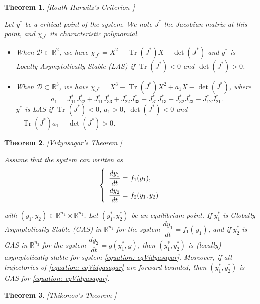 \documentclass{article}
\DeclareMathOperator{\Tr}{Tr}
\newtheorem{theorem}{Theorem}
\theoremstyle{definition}
\theoremstyle{remark}
\begin{document}
\begin{appendix}
\begin{theorem} \label{theorem:Routh-Hurwitz} [Routh-Hurwitz's Criterion \cite{wiggins_introduction_2003}]

Let $y^*$ be a critical point of the system. We note $J^*$ the Jacobian matrix at this point, and $\chi_{J^*}$ its characteristic polynomial.

\begin{itemize}
\item When $\mathcal{D}\subset \mathbb{R}^2$, we have $\chi_{J^*} = X^2 - \Tr(J^*) X + \det(J^*)$ and $y^*$ is Locally Asymptotically Stable (LAS) if $\Tr(J^*) < 0$ and $\det(J^*) > 0$.
\item When $\mathcal{D}\subset \mathbb{R}^3$, we have $\chi_{J^*} = X^3 - \Tr(J^*) X^2 + a_1 X - \det(J^*)$, where $$a_1 = J^*_{11}J^*_{22} + J^*_{11} J^*_{33} + J^*_{22}J^*_{33} - J^*_{31}J^*_{13} - J^*_{32}J^*_{23} - J^*_{12}J^*_{21}.$$  $y^*$ is LAS if $\Tr(J^*) < 0$, $a_1 > 0$, $\det(J^*) < 0$ and $-\Tr(J^*) a_1 + \det(J^*) > 0$.
\end{itemize}
\end{theorem}

\begin{theorem} \label{theorem:Vidyasagar} [Vidyasagar's Theorem  \cite{vidyasagar_decomposition_1980, dumont_mathematical_2012}]

Assume that the system can written as
\begin{equation}
\def\arraystretch{2}
\left\{ \begin{array}{l}
\dfrac{dy_1}{dt} = f_1(y_1), \\
\dfrac{dy_2}{dt} = f_2(y_1, y_2) 
\end{array} \right.
\label{equation: eqVidyasagar}
\end{equation}

with $(y_1, y_2) \in \mathbb{R}^{n_1} \times\mathbb{R}^{n_2}$. Let $(y_1^*, y^*_2)$ be an equilibrium point.
If $y^*_1$ is Globally Asymptotically Stable (GAS) in $\mathbb{R}^{n_1}$ for the system $\dfrac{dy_1}{dt} = f_1(y_1)$, and if $y^*_2$ is GAS in $\mathbb{R}^{n_2}$ for the system $\dfrac{dy_2}{dt} = g(y_1^*, y)$, then $(y_1^*, y_2^*)$ is (locally) asymptotically stable for system \eqref{equation: eqVidyasagar}. Moreover, if all trajectories of \eqref{equation: eqVidyasagar} are forward bounded, then $(y_1^*, y_2^*)$ is GAS for \eqref{equation: eqVidyasagar}.
\end{theorem}

\begin{theorem} \label{theorem:Tikhonov} [Thikonov's Theorem \cite{banasiak_methods_2014}]


\end{theorem}
\end{appendix}
\end{document}
